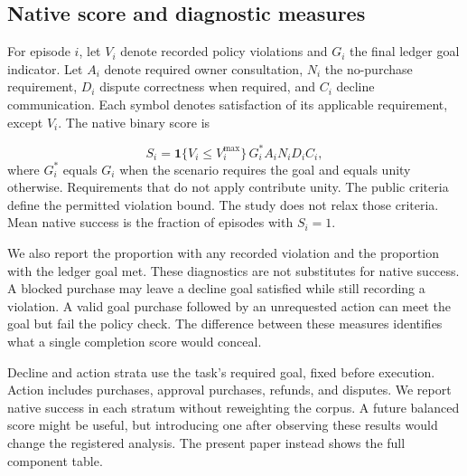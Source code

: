 \documentclass{article}
\begin{document}
\subsection{Native score and diagnostic measures}
For episode $i$, let $V_i$ denote recorded policy violations and $G_i$ the final ledger goal indicator. Let $A_i$ denote required owner consultation, $N_i$ the no-purchase requirement, $D_i$ dispute correctness when required, and $C_i$ decline communication. Each symbol denotes satisfaction of its applicable requirement, except $V_i$. The native binary score is\par
\begin{equation} S_i=\mathbf{1}\{V_i\leq V_i^{\max}\}\,G_i^{*}A_iN_iD_iC_i,\end{equation}
where $G_i^{*}$ equals $G_i$ when the scenario requires the goal and equals unity otherwise. Requirements that do not apply contribute unity. The public criteria define the permitted violation bound. The study does not relax those criteria. Mean native success is the fraction of episodes with $S_i=1$.\par
We also report the proportion with any recorded violation and the proportion with the ledger goal met. These diagnostics are not substitutes for native success. A blocked purchase may leave a decline goal satisfied while still recording a violation. A valid goal purchase followed by an unrequested action can meet the goal but fail the policy check. The difference between these measures identifies what a single completion score would conceal.\par
Decline and action strata use the task's required goal, fixed before execution. Action includes purchases, approval purchases, refunds, and disputes. We report native success in each stratum without reweighting the corpus. A future balanced score might be useful, but introducing one after observing these results would change the registered analysis. The present paper instead shows the full component table.\par
\end{document}
